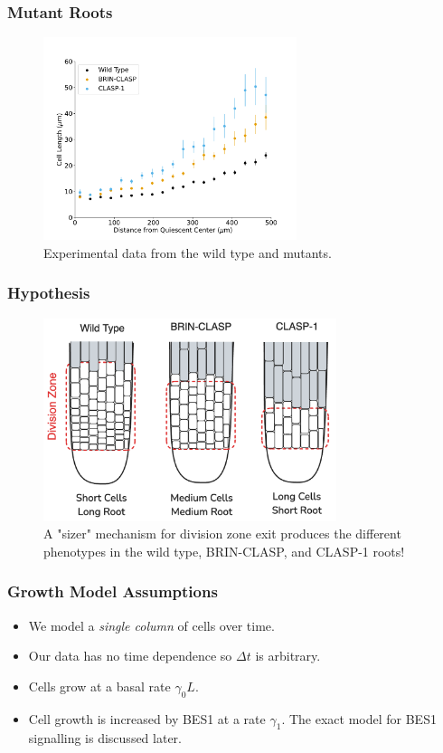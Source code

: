 \documentclass{beamer}
\begin{document}
\begin{frame}
\frametitle{Mutant Roots}
\begin{figure}
    \centering
    \includegraphics[height=16em]{data-binned-500.pdf}
    \caption{Experimental data from the wild type and mutants.}
\end{figure}
\end{frame}

\begin{frame}
\frametitle{Hypothesis}
\begin{figure}
    \centering
    \includegraphics[height=16em]{mutant-phenotypes.png}
    \caption{A "sizer" mechanism for division zone exit produces the different phenotypes in the wild type, BRIN-CLASP, and CLASP-1 roots!}
\end{figure}
\end{frame}


\begin{frame}
\frametitle{Growth Model Assumptions}
\begin{itemize}
    \setlength\itemsep{0.8em}
    \item We model a \emph{single column} of cells over time.
    \item Our data has no time dependence so $\Delta t$ is arbitrary.
    \item Cells grow at a basal rate $\gamma_{0}L$. 
    \item Cell growth is increased by BES1 at a rate $\gamma_{1}$. The exact model for BES1 signalling is discussed later.
\end{itemize}
\end{frame}
\end{document}
